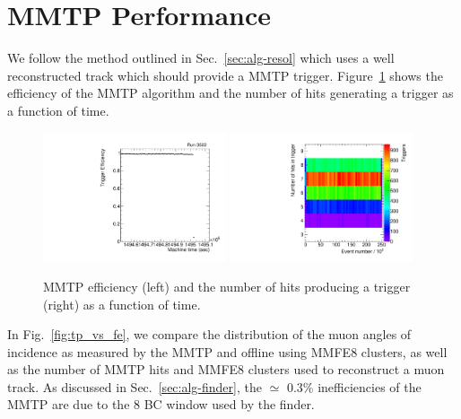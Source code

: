 \section{MMTP Performance}
\label{sec:perf}
We follow the method outlined in Sec.~\ref{sec:alg-resol} which uses a well reconstructed track which should provide a MMTP trigger.
 Figure~\ref{fig:lowlevel}
 shows the efficiency of the MMTP algorithm  and the number of hits generating a trigger as a function of time.
\begin{figure}[!htpb]
  \begin{center}
    \includegraphics[width=0.48\textwidth]{figures/gbtanalysis3522/tpeff.pdf}
    \includegraphics[width=0.48\textwidth]{figures/tuna_analysis/trigger_hits_vs_event.pdf}
  \end{center}
  \vspace{-10pt}
  \caption{MMTP efficiency  (left) and the number of hits producing a trigger (right)
 as a function of time.}
  \label{fig:lowlevel}
\end{figure}
In Fig.~\ref{fig:tp_vs_fe}, we compare the distribution of the muon angles of incidence as measured by the MMTP and offline using MMFE8 clusters, 
as well as the number of MMTP hits and MMFE8 clusters used to reconstruct a muon track. 
As discussed in Sec.~\ref{sec:alg-finder}, the $\simeq $ 0.3\% inefficiencies of the MMTP are due to the 8 BC window used by the finder.



